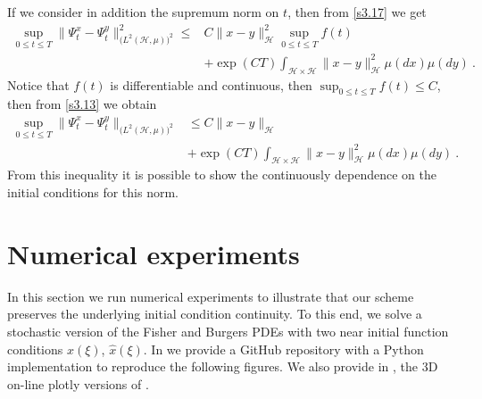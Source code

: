\documentclass[review,onefignum,onetabnum]{siamart190516}
\begin{document}
\begin{remark}
    If we consider in addition the supremum norm on $t$, then from
    \eqref{s3.17} we get
    \begin{equation}
        \label{s3.13}
        \begin{aligned}
            \sup_{0\le t\le T}\| \Psi_t^x-\Psi_t^y\|_{
                \big(L^2(\mathcal{H},\mu) \big)^2} ^ 2
                \le&
                 C \| x-y\|_{\mathcal{H}}^2
                 \sup_{0\le t\le T} f(t)
                 \\
                 &+
                \exp(CT)
                \int_{\mathcal{H}\times \mathcal{H}}
                \|x-y\|_{\mathcal{H}}^2 \mu(dx)\mu(dy) \ .
        \end{aligned}
    \end{equation}
    Notice that $f(t)$ is differentiable and continuous, then
    $\sup_{0\le t\le T} f(t)\le C$, then from \eqref{s3.13} we obtain
    \begin{equation}
        \label{s3.14}
        \begin{aligned}
            \sup_{0\le t\le T}
            \|
                \Psi_t^x-\Psi_t^y
            \|_{\big(L^2(\mathcal{H},\mu)\big)^2}
            &\le
            C \| x-y\|_{\mathcal{H}}
            \\
            & +
            \exp(CT)
            \int_{\mathcal{H}\times \mathcal{H}}
            \| x-y\|_{\mathcal{H}}^2 \mu(dx)\mu(dy) \ .
        \end{aligned}
    \end{equation}
    From this inequality it is possible to show the continuously dependence on
    the initial conditions for this norm.
\end{remark}

\section{Numerical experiments}
    \label{sec:NumericalExperiments}
        In this section we run numerical experiments to illustrate that our
    scheme preserves the underlying initial condition continuity. To 
    this end, we solve  a stochastic version of the  Fisher and Burgers PDEs 
    with two near initial function conditions $x(\xi)$, 
    $\widehat{x}(\xi)$. In \cite{matsumyaRepo} we provide a GitHub repository 
    with a Python implementation to reproduce the following figures. We also 
    provide in \cite{plotlyFisher, plotlyBurgers}, the 3D on-line plotly 
    versions of .
%
\end{document}
